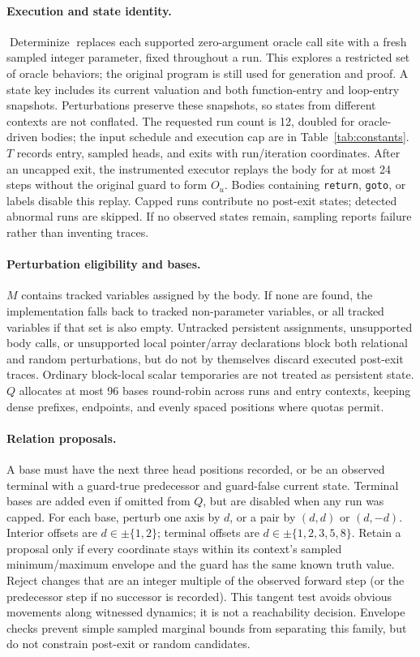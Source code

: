 \paragraph{Execution and state identity.}
\(\operatorname{Determinize}\) replaces each supported zero-argument oracle
call site with a fresh sampled integer parameter, fixed throughout a run.
This explores a restricted set of oracle behaviors; the original program is
still used for generation and proof.  A state key includes its current
valuation and both function-entry and loop-entry snapshots.  Perturbations
preserve these snapshots, so states from different contexts are not conflated.
The requested run count is 12, doubled for oracle-driven bodies; the input
schedule and execution cap are in Table~\ref{tab:constants}.
\(T\) records entry, sampled heads, and exits with run/iteration coordinates.
After an uncapped exit, the instrumented executor replays the body for at most
24 steps without the original guard to form \(O_u\).  Bodies containing
\texttt{return}, \texttt{goto}, or labels disable this replay.  Capped runs
contribute no post-exit states; detected abnormal runs are skipped.  If no
observed states remain, sampling reports failure rather than inventing traces.

\paragraph{Perturbation eligibility and bases.}
\(M\) contains tracked variables assigned by the body.  If none are found,
the implementation falls back to tracked non-parameter variables, or all
tracked variables if that set is also empty.  Untracked persistent assignments,
unsupported body calls, or unsupported local pointer/array declarations block
both relational and random perturbations, but do not by themselves discard
executed post-exit traces.  Ordinary block-local scalar temporaries are not
treated as persistent state.  \(Q\) allocates at most 96 bases round-robin
across runs and entry contexts, keeping dense prefixes, endpoints, and evenly
spaced positions where quotas permit.

\paragraph{Relation proposals.}
A base must have the next three head positions recorded, or be an observed
terminal with a guard-true predecessor and guard-false current state.
Terminal bases are added even if omitted from \(Q\), but are disabled when
any run was capped.  For each base, perturb one axis by \(d\), or a pair by
\((d,d)\) or \((d,-d)\).  Interior offsets are \(d\in\pm\{1,2\}\);
terminal offsets are \(d\in\pm\{1,2,3,5,8\}\).
Retain a proposal only if every coordinate stays within its context's sampled
minimum/maximum envelope and the guard has the same known truth value.
Reject changes that are an integer multiple of the observed forward step
(or the predecessor step if no successor is recorded).  This tangent test
avoids obvious movements along witnessed dynamics; it is not a reachability
decision.  Envelope checks prevent simple sampled marginal bounds from
separating this family, but do not constrain post-exit or random candidates.


